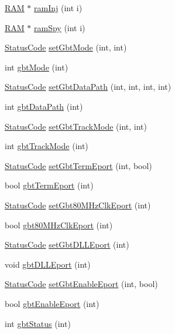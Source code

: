 \begin{DoxyCompactItemize}
\item 
\hyperlink{classRAM}{R\+AM} $\ast$ \hyperlink{classFEB__v1_aceff066f476794fefe2712e43bc2d6d2}{ram\+Inj} (int i)
\item 
\hyperlink{classRAM}{R\+AM} $\ast$ \hyperlink{classFEB__v1_ac59216f094007ede67d49bd23287be73}{ram\+Spy} (int i)
\item 
\hyperlink{classStatusCode}{Status\+Code} \hyperlink{classFEB__v1_a849040ff2fa8275b1a47e7be3915ebf4}{set\+Gbt\+Mode} (int, int)
\item 
int \hyperlink{classFEB__v1_aab7166214ef0f99f4835ce9a7416e052}{gbt\+Mode} (int)
\item 
\hyperlink{classStatusCode}{Status\+Code} \hyperlink{classFEB__v1_aabd651b11d1119ce3a19b7fb083cca78}{set\+Gbt\+Data\+Path} (int, int, int, int)
\item 
int \hyperlink{classFEB__v1_adf46e43506d1bd7cd26ca62c685e6c98}{gbt\+Data\+Path} (int)
\item 
\hyperlink{classStatusCode}{Status\+Code} \hyperlink{classFEB__v1_ab65b869df2adc4d3880caad71a4e3074}{set\+Gbt\+Track\+Mode} (int, int)
\item 
int \hyperlink{classFEB__v1_a25eeb132e9058cd421a085878fba9204}{gbt\+Track\+Mode} (int)
\item 
\hyperlink{classStatusCode}{Status\+Code} \hyperlink{classFEB__v1_ab7c261039c872c9f039fb7366a84d271}{set\+Gbt\+Term\+Eport} (int, bool)
\item 
bool \hyperlink{classFEB__v1_a84fa302a012eee663fe21829866fb20e}{gbt\+Term\+Eport} (int)
\item 
\hyperlink{classStatusCode}{Status\+Code} \hyperlink{classFEB__v1_a6efa59ad9f80ae40aad2df0b925b0b14}{set\+Gbt80\+M\+Hz\+Clk\+Eport} (int)
\item 
bool \hyperlink{classFEB__v1_ac22b1ffdc20be66330a66ebd12cd13f1}{gbt80\+M\+Hz\+Clk\+Eport} (int)
\item 
\hyperlink{classStatusCode}{Status\+Code} \hyperlink{classFEB__v1_a66584fe850cdf9e4ccd03fd4b2f4db38}{set\+Gbt\+D\+L\+L\+Eport} (int)
\item 
void \hyperlink{classFEB__v1_add5e12a5351c0c4986d24f433155351b}{gbt\+D\+L\+L\+Eport} (int)
\item 
\hyperlink{classStatusCode}{Status\+Code} \hyperlink{classFEB__v1_a30ce0e679748a4e2bf7f953b2162618f}{set\+Gbt\+Enable\+Eport} (int, bool)
\item 
bool \hyperlink{classFEB__v1_ae11c18013b56bdbb947e9ae147d6d77d}{gbt\+Enable\+Eport} (int)
\item 
int \hyperlink{classFEB__v1_a7b47a1b2c7af459b211eed59f4dbe9a7}{gbt\+Status} (int)

\end{DoxyCompactItemize}

